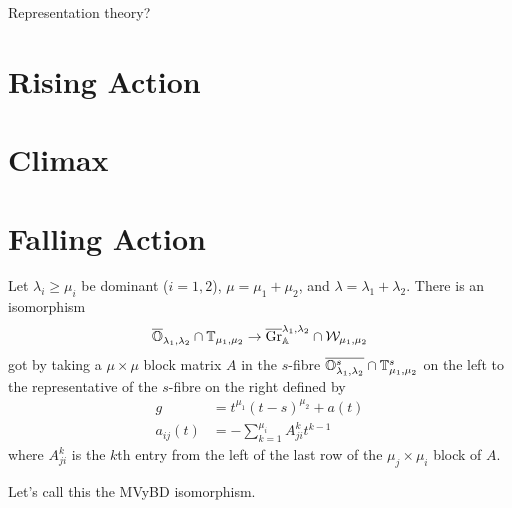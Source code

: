 \documentclass{article}
\begin{document}

Representation theory? 

\section{Rising Action} %

\section{Climax}

\section{Falling Action} %

\begin{theorem}
    Let $\lambda_i\ge\mu_i$ be dominant ($i=1,2$), $\mu = \mu_1 +\mu_2$, and $\lambda =\lambda_1+\lambda_2$. 
    There is an isomorphism 
    \begin{equation}
        \overline{\mathbb O}_{\lambda_1,\lambda_2}\cap\mathbb T_{\mu_1,\mu_2} \to \overline{\operatorname{Gr}}_\mathbb A^{\lambda_1,\lambda_2}\cap \mathcal W_{\mu_1,\mu_2}
    \end{equation}
    got by taking a $\mu\times\mu$ block matrix $A$ in the $s$-fibre $\overline{\mathbb O_{\lambda_1,\lambda_2}^s}\cap\mathbb T_{\mu_1,\mu_2}^s$ on the left to the representative of the $s$-fibre on the right defined by  
    \begin{equation}
        \begin{split}
            g &= t^{\mu_1} (t-s)^{\mu_2} + a(t) \\
            a_{ij}(t) &= - \sum_{k=1}^{\mu_i} A^k_{ji} t^{k-1}
        \end{split}
    \end{equation}
    where $A^k_{ji}$ is the $k$th entry from the left of the last row of the $\mu_j\times\mu_i$ block of $A$. 
\end{theorem}

Let's call this the MVyBD isomorphism.
\end{document}
